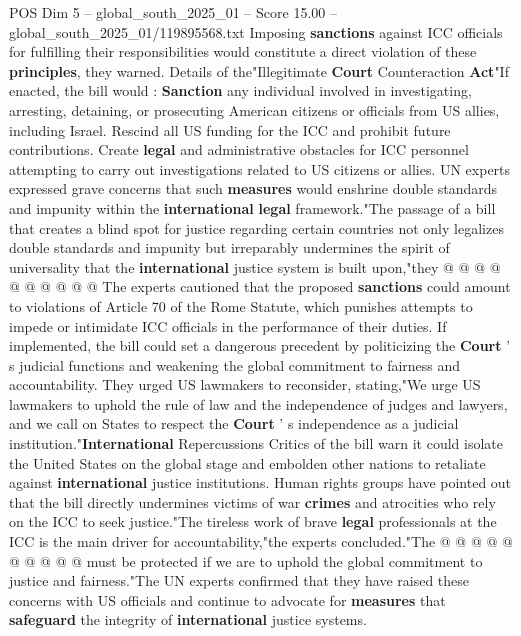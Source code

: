 \begin{textsample}{POS Dim 5 – global\_south\_2025\_01 – Score 15.00 – global\_south\_2025\_01/119895568.txt}
Imposing \textbf{sanctions} against ICC officials for fulfilling their responsibilities would constitute a direct violation of these \textbf{principles}, they warned.
Details of the"Illegitimate \textbf{Court} Counteraction \textbf{Act}"If enacted, the bill would : \textbf{Sanction} any individual involved in investigating, arresting, detaining, or prosecuting American citizens or officials from US allies, including Israel.
Rescind all US funding for the ICC and prohibit future contributions.
Create \textbf{legal} and administrative obstacles for ICC personnel attempting to carry out investigations related to US citizens or allies.
UN experts expressed grave concerns that such \textbf{measures} would enshrine double standards and impunity within the \textbf{international} \textbf{legal} framework."The passage of a bill that creates a blind spot for justice regarding certain countries not only legalizes double standards and impunity but irreparably undermines the spirit of universality that the \textbf{international} justice system is built upon,"they @ @ @ @ @ @ @ @ @ @ The experts cautioned that the proposed \textbf{sanctions} could amount to violations of Article 70 of the Rome Statute, which punishes attempts to impede or intimidate ICC officials in the performance of their duties.
If implemented, the bill could set a dangerous precedent by politicizing the \textbf{Court} ' s judicial functions and weakening the global commitment to fairness and accountability.
They urged US lawmakers to reconsider, stating,"We urge US lawmakers to uphold the rule of law and the independence of judges and lawyers, and we call on States to respect the \textbf{Court} ' s independence as a judicial institution."\textbf{International} Repercussions Critics of the bill warn it could isolate the United States on the global stage and embolden other nations to retaliate against \textbf{international} justice institutions.
Human rights groups have pointed out that the bill directly undermines victims of war \textbf{crimes} and atrocities who rely on the ICC to seek justice."The tireless work of brave \textbf{legal} professionals at the ICC is the main driver for accountability,"the experts concluded."The @ @ @ @ @ @ @ @ @ @ must be protected if we are to uphold the global commitment to justice and fairness."The UN experts confirmed that they have raised these concerns with US officials and continue to advocate for \textbf{measures} that \textbf{safeguard} the integrity of \textbf{international} justice systems.

\end{textsample}
